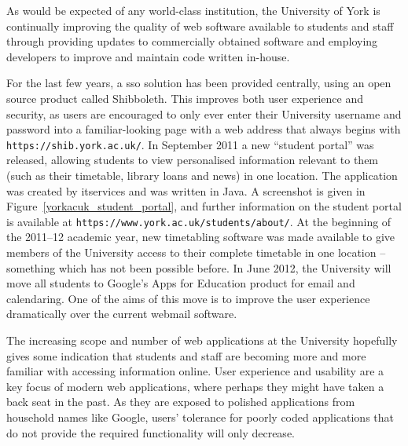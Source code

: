 
As would be expected of any world-class institution, the University of York is
continually improving the quality of web software available to students and
staff through providing updates to commercially obtained software and
employing developers to improve and maintain code written in-house.

For the last few years, a \gls{sso} solution has been provided centrally,
using an open source product called Shibboleth. This improves both user
experience and security, as users are encouraged to only ever enter their
University username and password into a familiar-looking page with a web
address that always begins with \texttt{https://shib.york.ac.uk/}. In
September 2011 a new ``student portal'' was released, allowing students to
view personalised information relevant to them (such as their timetable,
library loans and news) in one location. The application was created by
\gls{itservices} and was written in Java. A screenshot is given in
Figure~\ref{yorkacuk_student_portal}, and further information on the student
portal is available at \texttt{https://www.york.ac.uk/students/about/}. At the
beginning of the 2011--12 academic year, new timetabling software was made
available to give members of the University access to their complete timetable
in one location -- something which has not been possible before. In June 2012,
the University will move all students to Google's Apps for Education product
for email and calendaring. One of the aims of this move is to improve the user
experience dramatically over the current webmail software.

The increasing scope and number of web applications at the University
hopefully gives some indication that students and staff are becoming more and
more familiar with accessing information online. User experience and usability
are a key focus of modern web applications, where perhaps they might have
taken a back seat in the past. As they are exposed to polished applications
from household names like Google, users' tolerance for poorly coded
applications that do not provide the required functionality will only
decrease.

